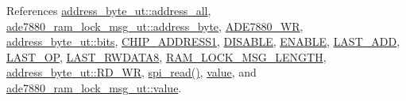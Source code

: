 References \hyperlink{a00041_source_l00023}{address\-\_\-byte\-\_\-ut\-::address\-\_\-all}, \hyperlink{a00041_source_l00189}{ade7880\-\_\-ram\-\_\-lock\-\_\-msg\-\_\-ut\-::address\-\_\-byte}, \hyperlink{a00041_source_l00013}{A\-D\-E7880\-\_\-\-W\-R}, \hyperlink{a00011_ae121725fb28cc26495969d71e0e0d42e}{address\-\_\-byte\-\_\-ut\-::bits}, \hyperlink{a00037_source_l00039}{C\-H\-I\-P\-\_\-\-A\-D\-D\-R\-E\-S\-S1}, \hyperlink{a00037_source_l00041}{D\-I\-S\-A\-B\-L\-E}, \hyperlink{a00037_source_l00040}{E\-N\-A\-B\-L\-E}, \hyperlink{a00036_source_l00314}{L\-A\-S\-T\-\_\-\-A\-D\-D}, \hyperlink{a00036_source_l00316}{L\-A\-S\-T\-\_\-\-O\-P}, \hyperlink{a00036_source_l00048}{L\-A\-S\-T\-\_\-\-R\-W\-D\-A\-T\-A8}, \hyperlink{a00041_source_l00017}{R\-A\-M\-\_\-\-L\-O\-C\-K\-\_\-\-M\-S\-G\-\_\-\-L\-E\-N\-G\-T\-H}, \hyperlink{a00041_source_l00026}{address\-\_\-byte\-\_\-ut\-::\-R\-D\-\_\-\-W\-R}, \hyperlink{a00040_source_l00147}{spi\-\_\-read()}, \hyperlink{a00041_source_l00195}{value}, and \hyperlink{a00041_source_l00191}{ade7880\-\_\-ram\-\_\-lock\-\_\-msg\-\_\-ut\-::value}.


